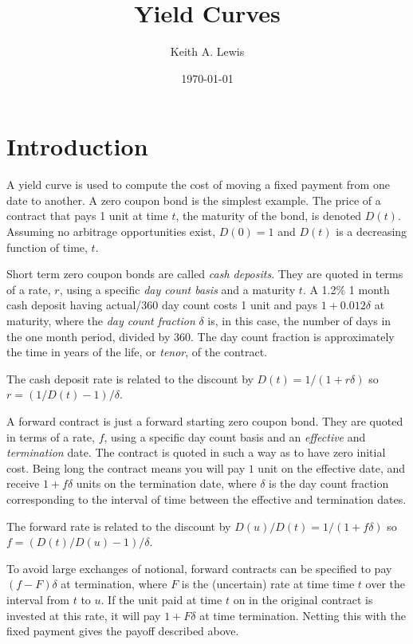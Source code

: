 \documentclass[12pt]{amsart}
\begin{document}
\title{Yield Curves}
\date{\today}
\author{Keith A. Lewis}
\address{KALX, LLC}
\maketitle


\section{Introduction}

A yield curve is used to compute the cost of moving a fixed payment from
one date to another. A zero coupon bond is the simplest example.
The price of a contract that pays 1 unit at time $t$, the maturity
of the bond, is denoted $D(t)$. Assuming no arbitrage opportunities
exist, $D(0) = 1$ and $D(t)$ is a decreasing function of time, $t$.

Short term zero coupon bonds are called {\em cash deposits}.  They are
quoted in terms of a rate, $r$, using a specific {\em day count basis}
and a maturity $t$. A 1.2\% 1 month cash deposit having actual/360 day
count costs 1 unit and pays $1 + 0.012\delta$ at maturity, where the {\em
day count fraction} $\delta$ is, in this case, the number of days in the
one month period, divided by 360. The day count fraction is approximately
the time in years of the life, or {\em tenor}, of the contract.

The cash deposit rate is related to the discount by
$D(t) = 1/(1 + r\delta)$ so $r = (1/D(t) - 1)/\delta$.

A forward contract is just a forward starting zero coupon bond.
They are quoted in terms of a rate, $f$, using a specific day
count basis and an {\em effective} and {\em termination} date.
The contract is quoted in such a way as to have zero initial
cost. Being long the contract means you will pay $1$ unit
on the effective date, and receive $1 + f\delta$ units on the
termination date, where $\delta$ is the day count fraction
corresponding to the interval of time between the effective
and termination dates.

The forward rate is related to the discount by
$D(u)/D(t) = 1/(1 + f\delta)$ so $f = (D(t)/D(u) - 1)/\delta$.

To avoid large exchanges of notional, forward contracts can be specified
to pay $(f - F)\delta$ at termination, where $F$ is the (uncertain)
rate at time time $t$ over the interval from $t$ to $u$. If the unit
paid at time $t$ on in the original contract is invested at this rate,
it will pay $1 + F\delta$ at time termination. Netting this with the
fixed payment gives the payoff described above.
\end{document}
